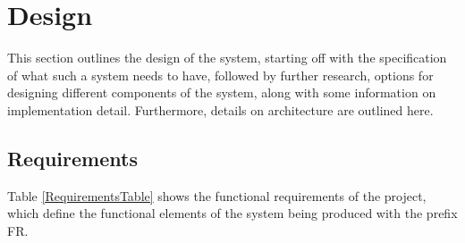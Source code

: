\documentclass[12pt,a4paper]{article}
\begin{document}
\section{Design}

This section outlines the design of the system, starting off with the specification of what such a system
needs to have, followed by further research, options for designing different components of the system,
along with some information on implementation detail. Furthermore, details on architecture are outlined here.

\subsection{Requirements}
Table \ref{RequirementsTable} shows the functional requirements of the project,
which define the functional elements of the system being produced with the prefix FR.
\end{document}
